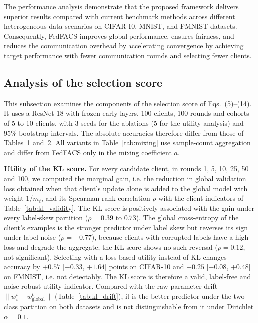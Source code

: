 \documentclass[pdflatex,sn-mathphys-num,oneside]{sn-jnl}%
\theoremstyle{thmstyleone}%
\theoremstyle{thmstyletwo}%
\theoremstyle{thmstylethree}%
\begin{document}
The performance analysis demonstrate that the proposed framework delivers superior results compared with current benchmark methods across different heterogeneous data scenarios on CIFAR-10, MNIST, and FMNIST datasets. Consequently, FedFACS improves global performance, ensures fairness, and reduces the communication overhead by accelerating convergence by achieving target performance with fewer communication rounds and selecting fewer clients.


\FloatBarrier
\subsection{Analysis of the selection score}\label{sec:score_analysis}
This subsection examines the components of the selection score of Eqs.~(5)--(14). It uses a ResNet-18 with frozen early layers, 100 clients, 100 rounds and cohorts of 5 to 10 clients, with 3 seeds for the ablations (5 for the utility analysis) and 95\% bootstrap intervals. The absolute accuracies therefore differ from those of Tables~1 and~2. All variants in Table~\ref{tab:mixing} use sample-count aggregation and differ from FedFACS only in the mixing coefficient $a$.

\textbf{Utility of the KL score.} For every candidate client, in rounds 1, 5, 10, 25, 50 and 100, we computed the marginal gain, i.e. the reduction in global validation loss obtained when that client's update alone is added to the global model with weight $1/m_t$, and its Spearman rank correlation $\rho$ with the client indicators of Table~\ref{tab:kl_validity}. The KL score is positively associated with the gain under every label-skew partition ($\rho=0.39$ to $0.73$). The global cross-entropy of the client's examples is the stronger predictor under label skew but reverses its sign under label noise ($\rho=-0.77$), because clients with corrupted labels have a high loss and degrade the aggregate; the KL score shows no such reversal ($\rho=0.12$, not significant). Selecting with a loss-based utility instead of KL changes accuracy by $+0.57$ [$-0.33$, $+1.64$] points on CIFAR-10 and $+0.25$ [$-0.08$, $+0.48$] on FMNIST, i.e. not detectably. The KL score is therefore a valid, label-free and noise-robust utility indicator. Compared with the raw parameter drift $\lVert w_i^t-w_{\mathrm{global}}^t\rVert$ (Table~\ref{tab:kl_drift}), it is the better predictor under the two-class partition on both datasets and is not distinguishable from it under Dirichlet $\alpha=0.1$.
\end{document}
